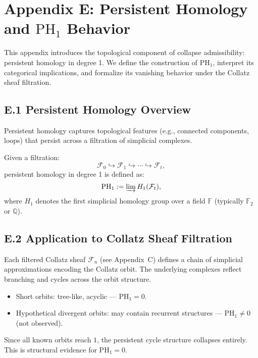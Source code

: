 \documentclass[11pt]{article}
\begin{document}
\appendix
\section*{Appendix E: Persistent Homology and \( \mathrm{PH}_1 \) Behavior}

This appendix introduces the topological component of collapse admissibility: persistent homology in degree 1. We define the construction of \( \mathrm{PH}_1 \), interpret its categorical implications, and formalize its vanishing behavior under the Collatz sheaf filtration.

\subsection*{E.1 Persistent Homology Overview}

Persistent homology captures topological features (e.g., connected components, loops) that persist across a filtration of simplicial complexes.

Given a filtration:
\[
\mathcal{F}_0 \hookrightarrow \mathcal{F}_1 \hookrightarrow \cdots \hookrightarrow \mathcal{F}_t,
\]
persistent homology in degree 1 is defined as:
\[
\mathrm{PH}_1 := \varinjlim H_1(\mathcal{F}_t),
\]
where \( H_1 \) denotes the first simplicial homology group over a field \( \mathbb{F} \) (typically \( \mathbb{F}_2 \) or \( \mathbb{Q} \)).

\subsection*{E.2 Application to Collatz Sheaf Filtration}

Each filtered Collatz sheaf \( \mathcal{F}_n \) (see Appendix~C) defines a chain of simplicial approximations encoding the Collatz orbit. The underlying complexes reflect branching and cycles across the orbit structure.

\begin{itemize}
  \item Short orbits: tree-like, acyclic — \( \mathrm{PH}_1 = 0 \).
  \item Hypothetical divergent orbits: may contain recurrent structures — \( \mathrm{PH}_1 \neq 0 \) (not observed).
\end{itemize}

Since all known orbits reach \( 1 \), the persistent cycle structure collapses entirely. This is structural evidence for \( \mathrm{PH}_1 = 0 \).
\end{document}
